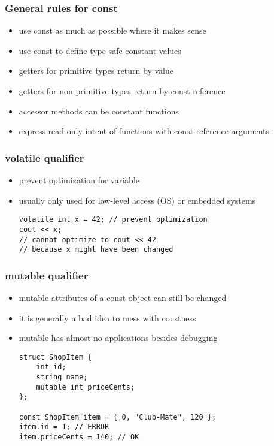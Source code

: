 \begin{frame}[fragile]
    \frametitle{General rules for const}
    \begin{itemize}
    \item use const as much as possible where it makes sense
    \item use const to define type-safe constant values
    \item getters for primitive types return by value
    \item getters for non-primitive types return by const reference
    \item accessor methods can be constant functions
    \item express read-only intent of functions with const reference arguments
    \end{itemize}
\end{frame}

\begin{frame}[fragile]
    \frametitle{volatile qualifier}
    \begin{itemize}
    \item prevent optimization for variable
    \item usually only used for low-level access (OS) or embedded systems
    \begin{lstlisting}[numbers=none]
volatile int x = 42; // prevent optimization
cout << x;
// cannot optimize to cout << 42
// because x might have been changed 
    \end{lstlisting}
    \end{itemize}
\end{frame}

\begin{frame}[fragile]
    \frametitle{mutable qualifier}
    \begin{itemize}
    \item mutable attributes of a const object can still be changed
    \item it is generally a bad idea to mess with constness
    \item mutable has almost no applications besides debugging
    \begin{lstlisting}[numbers=none]
struct ShopItem {
    int id;
    string name;
    mutable int priceCents;
};

const ShopItem item = { 0, "Club-Mate", 120 };
item.id = 1; // ERROR
item.priceCents = 140; // OK
    \end{lstlisting}
    \end{itemize}
\end{frame}


